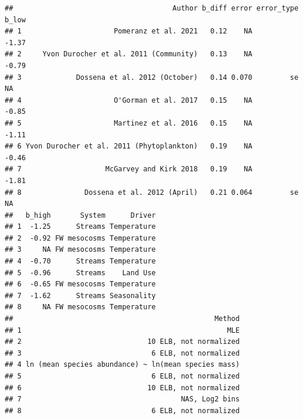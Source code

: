 \documentclass[
]{article}
\begin{document}
\begin{verbatim}
##                                      Author b_diff error error_type b_low
## 1                      Pomeranz et al. 2021   0.12    NA            -1.37
## 2     Yvon Durocher et al. 2011 (Community)   0.13    NA            -0.79
## 3             Dossena et al. 2012 (October)   0.14 0.070         se    NA
## 4                      O'Gorman et al. 2017   0.15    NA            -0.85
## 5                      Martinez et al. 2016   0.15    NA            -1.11
## 6 Yvon Durocher et al. 2011 (Phytoplankton)   0.19    NA            -0.46
## 7                    McGarvey and Kirk 2018   0.19    NA            -1.81
## 8               Dossena et al. 2012 (April)   0.21 0.064         se    NA
##   b_high       System      Driver
## 1  -1.25      Streams Temperature
## 2  -0.92 FW mesocosms Temperature
## 3     NA FW mesocosms Temperature
## 4  -0.70      Streams Temperature
## 5  -0.96      Streams    Land Use
## 6  -0.65 FW mesocosms Temperature
## 7  -1.62      Streams Seasonality
## 8     NA FW mesocosms Temperature
##                                                Method
## 1                                                 MLE
## 2                              10 ELB, not normalized
## 3                               6 ELB, not normalized
## 4 ln (mean species abundance) ~ ln(mean species mass)
## 5                               6 ELB, not normalized
## 6                              10 ELB, not normalized
## 7                                      NAS, Log2 bins
## 8                               6 ELB, not normalized
\end{verbatim}
\end{document}
